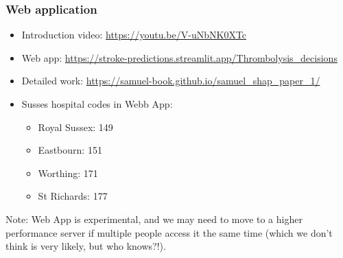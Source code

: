 \begin{frame}
\frametitle{Web application}

\begin{itemize}
    \item Introduction video: \url{https://youtu.be/V-uNbNK0XTc}
    \item Web app: \url{https://stroke-predictions.streamlit.app/Thrombolysis_decisions}
    \item Detailed work: \url{https://samuel-book.github.io/samuel_shap_paper_1/}
    \item Susses hospital codes in Webb App:
    \begin{itemize}
        \item Royal Sussex: 149
        \item Eastbourn: 151
        \item Worthing: 171
        \item St Richards: 177
    \end{itemize}
\end{itemize}

\vspace{3mm}
Note: Web App is experimental, and we may need to move to a higher performance server if multiple people access it the same time (which we don't think is very likely, but who knows?!).
 
\end{frame}